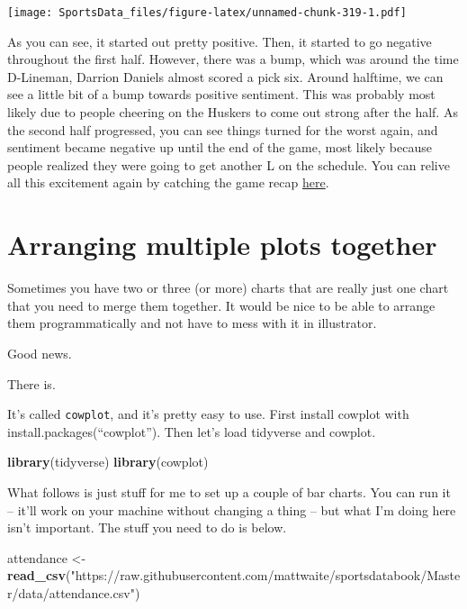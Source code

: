 \documentclass[]{book}
\newenvironment{Shaded}{\begin{snugshade}}{\end{snugshade}}
\newcommand{\KeywordTok}[1]{\textcolor[rgb]{0.13,0.29,0.53}{\textbf{#1}}}
\newcommand{\NormalTok}[1]{#1}
\newcommand{\StringTok}[1]{\textcolor[rgb]{0.31,0.60,0.02}{#1}}
\begin{document}
\texttt{[image: SportsData\_files/figure-latex/unnamed-chunk-319-1.pdf]}

As you can see, it started out pretty positive. Then, it started to go negative throughout the first half. However, there was a bump, which was around the time D-Lineman, Darrion Daniels almost scored a pick six. Around halftime, we can see a little bit of a bump towards positive sentiment. This was probably most likely due to people cheering on the Huskers to come out strong after the half. As the second half progressed, you can see things turned for the worst again, and sentiment became negative up until the end of the game, most likely because people realized they were going to get another L on the schedule. You can relive all this excitement again by catching the game recap \href{https://www.youtube.com/watch?v=m0hKH6Zb0vY\&feature=onebox}{here}.

\hypertarget{arranging-multiple-plots-together}{%
\chapter{Arranging multiple plots together}\label{arranging-multiple-plots-together}}

Sometimes you have two or three (or more) charts that are really just one chart that you need to merge them together. It would be nice to be able to arrange them programmatically and not have to mess with it in illustrator.

Good news.

There is.

It's called \texttt{cowplot}, and it's pretty easy to use. First install cowplot with install.packages(``cowplot''). Then let's load tidyverse and cowplot.

\begin{Shaded}
\begin{Highlighting}[]
\KeywordTok{library}\NormalTok{(tidyverse)}
\KeywordTok{library}\NormalTok{(cowplot)}
\end{Highlighting}
\end{Shaded}

What follows is just stuff for me to set up a couple of bar charts. You can run it -- it'll work on your machine without changing a thing -- but what I'm doing here isn't important. The stuff you need to do is below.

\begin{Shaded}
\begin{Highlighting}[]
\NormalTok{attendance <-}\StringTok{ }\KeywordTok{read_csv}\NormalTok{(}\StringTok{"https://raw.githubusercontent.com/mattwaite/sportsdatabook/Master/data/attendance.csv"}\NormalTok{)}
\end{Highlighting}
\end{Shaded}
\end{document}
